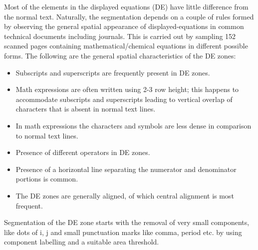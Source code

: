 \documentclass[12pt]{IEEEtran}
\begin{document}
Most of the elements in the displayed equations (DE) have little difference from the  normal text.
Naturally, the segmentation depends on a couple of rules formed by observing the general spatial appearance
of displayed-equations in common technical documents including journals.
This is carried out  by sampling 152 scanned pages containing mathematical/chemical equations in different possible forms. The following  are the general spatial characteristics of the DE zones:
\begin{itemize}
  \item Subscripts and superscripts are frequently present in DE zones.
\item Math expressions are often written using 2-3 row height; this happens to accommodate subscripts and superscripts
leading to vertical overlap of characters that is absent in  normal text lines.
 \item In math expressions the characters and symbols are less dense in comparison to normal text lines.
 \item Presence of different operators in DE zones.
 \item Presence of a horizontal line separating the numerator and denominator portions is common.
 \item The DE zones are generally aligned, of which central alignment is most frequent.
 \end{itemize}

Segmentation of the DE zone starts with the removal of 
very small components, like dots of i,  j and small
punctuation marks  like comma,  period etc. by using component labelling and a suitable area threshold.
\end{document}
